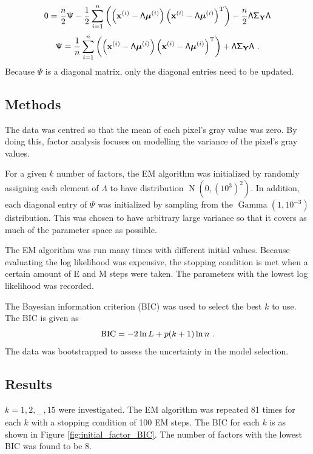 \documentclass[12pt]{report}
\DeclareMathOperator{\normal}{N}
\DeclareMathOperator{\gammaDist}{Gamma}
\newcommand{\T}{^\textup{T}}
\newcommand{\dotdotdot}{_{\phantom{.}\cdots}}
\newcommand{\BIC}{\textup{BIC}}
\newcommand{\vect}[1]{\mathbf{#1}}
\newcommand{\vectGreek}[1]{\boldsymbol{#1}}
\newcommand{\matr}[1]{\mathsf{#1}}
\begin{document}
\begin{equation*}
\matr{0} = \frac{n}{2}\matr{\Psi}
-\frac{1}{2}\sum_{i=1}^{n}\left(
\left(\vect{x}^{(i)}-\matr{\Lambda}\vectGreek{\mu}^{(i)}\right)
\left(\vect{x}^{(i)}-\matr{\Lambda}\vectGreek{\mu}^{(i)}\right)\T
\right)
-\frac{n}{2}\matr{\Lambda}\matr{\Sigma}_{\vect{Y}}\matr{\Lambda}
\end{equation*}
\begin{equation}
\matr{\Psi} =
\frac{1}{n}\sum_{i=1}^{n}\left(
\left(\vect{x}^{(i)}-\matr{\Lambda}\vectGreek{\mu}^{(i)}\right)
\left(\vect{x}^{(i)}-\matr{\Lambda}\vectGreek{\mu}^{(i)}\right)\T
\right)
+\matr{\Lambda}\matr{\Sigma}_{\vect{Y}}\matr{\Lambda}\ .
\end{equation}
Because $\matr{\Psi}$ is a diagonal matrix, only the diagonal entries need to be updated.
\subsection{Methods}
The data was centred so that the mean of each pixel's gray value was zero. By doing this, factor analysis focuses on modelling the variance of the pixel's gray values.

For a given $k$ number of factors, the EM algorithm was initialized by randomly assigning each element of $\matr{\Lambda}$ to have distribution $\normal(0,(10^3)^2)$. In addition, each diagonal entry of $\matr{\Psi}$ was initialized by sampling from the $\gammaDist(1,10^{-3})$ distribution. This was chosen to have arbitrary large variance so that it covers as much of the parameter space as possible.

The EM algorithm was run many times with different initial values. Because evaluating the log likelihood was expensive, the stopping condition is met when a certain amount of E and M steps were taken. The parameters with the lowest log likelihood was recorded.

The Bayesian information criterion (BIC) was used to select the best $k$ to use. The BIC is given as
\begin{equation}
\BIC=-2\ln L + p(k+1)\ln n \ .
\end{equation}
The data was bootstrapped to assess the uncertainty in the model selection.

\subsection{Results}
$k=1,2,\dotdotdot,15$ were investigated. The EM algorithm was repeated 81 times for each $k$ with a stopping condition of 100 EM steps. The BIC for each $k$ is as shown in Figure \ref{fig:initial_factor_BIC}. The number of factors with the lowest BIC was found to be 8.
\end{document}
